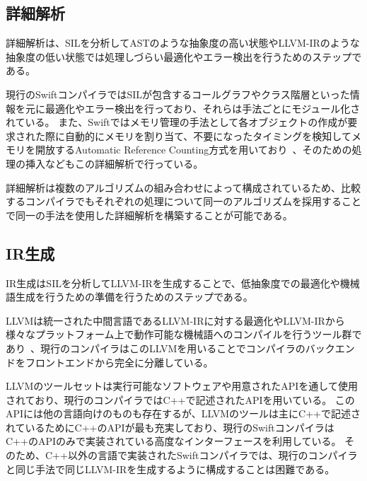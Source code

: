 \subsection{詳細解析}
\label{refinement:structure:analyze}

詳細解析は、SILを分析してASTのような抽象度の高い状態やLLVM-IRのような抽象度の低い状態では処理しづらい最適化やエラー検出を行うためのステップである。

現行のSwiftコンパイラではSILが包含するコールグラフやクラス階層といった情報を元に最適化やエラー検出を行っており、それらは手法ごとにモジュール化されている。
また、Swiftではメモリ管理の手法として各オブジェクトの作成が要求された際に自動的にメモリを割り当て、不要になったタイミングを検知してメモリを開放するAutomatic Reference Counting方式を用いており~\cite{arc}、そのための処理の挿入などもこの詳細解析で行っている。

詳細解析は複数のアルゴリズムの組み合わせによって構成されているため、比較するコンパイラでもそれぞれの処理について同一のアルゴリズムを採用することで同一の手法を使用した詳細解析を構築することが可能である。

\subsection{IR生成}

IR生成はSILを分析してLLVM-IRを生成することで、低抽象度での最適化や機械語生成を行うための準備を行うためのステップである。

LLVMは統一された中間言語であるLLVM-IRに対する最適化やLLVM-IRから様々なプラットフォーム上で動作可能な機械語へのコンパイルを行うツール群であり~\cite{llvm}、現行のコンパイラはこのLLVMを用いることでコンパイラのバックエンドをフロントエンドから完全に分離している。

LLVMのツールセットは実行可能なソフトウェアや用意されたAPIを通して使用されており、現行のコンパイラではC++で記述されたAPIを用いている。
このAPIには他の言語向けのものも存在するが、LLVMのツールは主にC++で記述されているためにC++のAPIが最も充実しており、現行のSwiftコンパイラはC++のAPIのみで実装されている高度なインターフェースを利用している。
そのため、C++以外の言語で実装されたSwiftコンパイラでは、現行のコンパイラと同じ手法で同じLLVM-IRを生成するように構成することは困難である。
